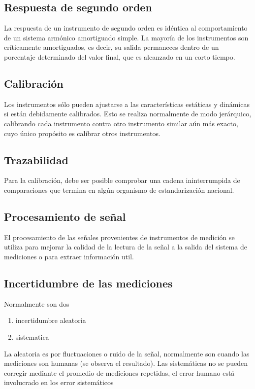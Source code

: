 \documentclass[11pt]{report}
\theoremstyle{plain}
\theoremstyle{definition}
\begin{document}
\subsection*{Respuesta de segundo orden}
La respuesta de un instrumento de segundo orden es idéntica al comportamiento de un sistema armónico amortiguado simple.
La mayoría de los instrumentos son críticamente amortiguados, es decir, su salida permaneces dentro de un porcentaje determinado del valor final, que es alcanzado en un corto tiempo.

\subsection*{Calibración}
Los instrumentos sólo pueden ajustarse a las características estáticas y dinámicas si están debidamente calibrados. Esto se realiza normalmente de modo jerárquico, calibrando cada instrumento contra otro instrumento similar aún más exacto, cuyo único propósito es calibrar otros instrumentos.

\subsection*{Trazabilidad}
Para la calibración, debe ser posible comprobar una cadena ininterrumpida de comparaciones que termina en algún organismo de estandarización nacional.

\subsection*{Procesamiento de señal}
El procesamiento de las señales provenientes de instrumentos de medición se utiliza para mejorar la calidad de la lectura de la señal a la salida del sistema de mediciones o para extraer información util.

\subsection*{Incertidumbre de las mediciones}
Normalmente son dos

\begin{enumerate}
	\item incertidumbre aleatoria
	\item sistematica
\end{enumerate}

La aleatoria es por fluctuaciones o ruido de la señal, normalmente son cuando las mediciones son humanas (se observa el resultado).
Las sistemáticas no se pueden corregir mediante el promedio de mediciones repetidas, el error humano está involucrado en los error sistemáticos
\end{document}
